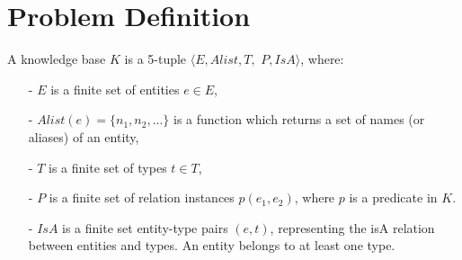 \section{Problem Definition}
\label{sec:problem}






A knowledge base $K$ is a 5-tuple $\langle E, Alist, T, $ $P, IsA \rangle$,
where:
\begin{itemize}
    \itemsep=-0.2cm
    \item[-] $E$ is a finite set of entities $e \in E$,
    \item[-] $Alist(e) = \{n_1, n_2, ...\}$ is a function which returns
    a set of names (or aliases) of an entity,
    \item[-] $T$ is a finite set of types $t \in T$,
    \item[-] $P$ is a finite set of relation instances $p(e_1, e_2)$, where
    $p$ is a predicate in $K$.
    \item[-] $IsA$ is a finite set entity-type pairs $(e, t)$, 
    representing the isA relation between entities and types.
    An entity belongs to at least one type.
\end{itemize}

